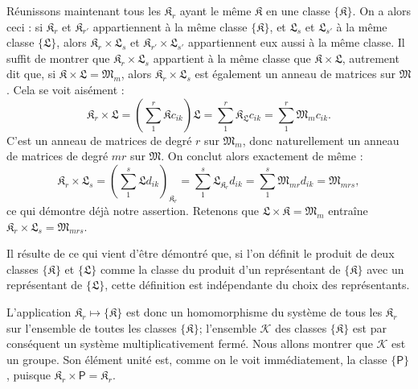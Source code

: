 Réunissons maintenant tous les \(\mathfrak K_r\) ayant le même \(\mathfrak K\) en une classe \(\{\mathfrak K\}\). On a alors ceci : si \(\mathfrak K_r\) et \(\mathfrak K_{r'}\) appartiennent à la même classe \(\{\mathfrak K\}\), et \(\mathfrak L_s\) et \(\mathfrak L_{s'}\) à la même classe \(\{\mathfrak L\}\), alors \(\mathfrak K_r\times\mathfrak L_s\) et \(\mathfrak K_{r'}\times\mathfrak L_{s'}\) appartiennent eux aussi à la même classe. Il suffit de montrer que \(\mathfrak K_r\times\mathfrak L_s\) appartient à la même classe que \(\mathfrak K\times\mathfrak L\), autrement dit que, si \(\mathfrak K\times\mathfrak L=\mathfrak M_m\), alors \(\mathfrak K_r\times\mathfrak L_s\) est également un anneau de matrices sur \(\mathfrak M\). Cela se voit aisément :
\[
\mathfrak K_r\times\mathfrak L
=\left(\sum_1^r\mathfrak K c_{ik}\right)\mathfrak L
=\sum_1^r\mathfrak K_{\mathfrak L}c_{ik}
=\sum_1^r\mathfrak M_m c_{ik}.
\]
C'est un anneau de matrices de degré \(r\) sur \(\mathfrak M_m\), donc naturellement un anneau de matrices de degré \(mr\) sur \(\mathfrak M\). On conclut alors exactement de même :
\[
\mathfrak K_r\times\mathfrak L_s
=\left(\sum_1^s\mathfrak L d_{ik}\right)_{\mathfrak K_r}
=\sum_1^s\mathfrak L_{\mathfrak K_r}d_{ik}
=\sum_1^s\mathfrak M_{mr}d_{ik}
=\mathfrak M_{mrs},
\]
ce qui démontre déjà notre assertion. Retenons que \(\mathfrak L\times\mathfrak K=\mathfrak M_m\) entraîne \(\mathfrak K_r\times\mathfrak L_s=\mathfrak M_{mrs}\).

Il résulte de ce qui vient d'être démontré que, si l'on définit le produit de deux classes \(\{\mathfrak K\}\) et \(\{\mathfrak L\}\) comme la classe du produit d'un représentant de \(\{\mathfrak K\}\) avec un représentant de \(\{\mathfrak L\}\), cette définition est indépendante du choix des représentants.

L'application \(\mathfrak K_r\mapsto\{\mathfrak K\}\) est donc un homomorphisme du système de tous les \(\mathfrak K_r\) sur l'ensemble de toutes les classes \(\{\mathfrak K\}\); l'ensemble \(\mathscr K\) des classes \(\{\mathfrak K\}\) est par conséquent un système multiplicativement fermé. Nous allons montrer que \(\mathscr K\) est un groupe. Son élément unité est, comme on le voit immédiatement, la classe \(\{\mathsf P\}\), puisque \(\mathfrak K_r\times\mathsf P=\mathfrak K_r\).

